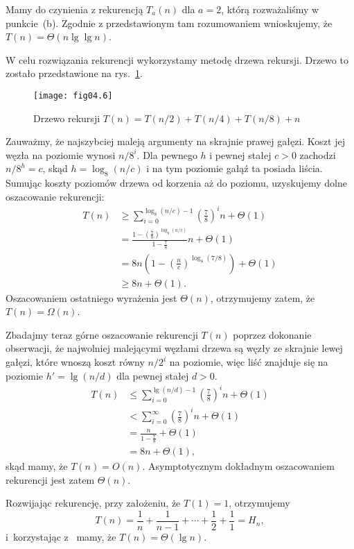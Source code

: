 \subproblem %
Mamy do czynienia z rekurencją $T_a(n)$ dla $a=2$, którą rozważaliśmy w punkcie~(b). Zgodnie z przedstawionym tam rozumowaniem wnioskujemy, że $T(n)=\Theta(n\lg\lg n)$.

\subproblem %
W celu rozwiązania rekurencji wykorzystamy metodę drzewa rekursji. Drzewo to zostało przedstawione na rys.~\ref{fig:4-4f}.
\begin{figure}[ht]
	\begin{center}
		\texttt{[image: fig04.6]}
	\end{center}
	\caption{Drzewo rekursji $T(n)=T(n/2)+T(n/4)+T(n/8)+n$} \label{fig:4-4f}
\end{figure}

Zauważmy, że najszybciej maleją argumenty na skrajnie prawej gałęzi. Koszt jej węzła na  poziomie wynosi $n/8^i$. Dla pewnego $h$ i pewnej stałej $c>0$ zachodzi $n/8^h=c$, skąd $h=\log_8(n/c)$ i na tym poziomie gałąź ta posiada liścia. Sumując koszty poziomów drzewa od korzenia aż do  poziomu, uzyskujemy dolne oszacowanie rekurencji:
\begin{align*}
	T(n) &\ge \sum_{i=0}^{\log_8(n/c)-1}\left(\frac{7}{8}\right)^in+\Theta(1) \\
	&= \frac{1-\left(\frac{7}{8}\right)^{\log_8(n/c)}}{1-\frac{7}{8}}n+\Theta(1) \\
	&= 8n\left(1-\left(\frac{n}{c}\right)^{\log_8(7/8)}\right)+\Theta(1) \\
	&\ge 8n+\Theta(1).
\end{align*}
Oszacowaniem ostatniego wyrażenia jest $\Theta(n)$, otrzymujemy zatem, że $T(n)=\Omega(n)$.

Zbadajmy teraz górne oszacowanie rekurencji $T(n)$ poprzez dokonanie obserwacji, że najwolniej malejącymi węzłami drzewa są węzły ze skrajnie lewej gałęzi, które wnoszą koszt równy $n/2^i$ na  poziomie, więc liść znajduje się na poziomie $h'=\lg(n/d)$ dla pewnej stałej $d>0$.
\begin{align*}
	T(n) &\le \sum_{i=0}^{\lg(n/d)-1}\left(\frac{7}{8}\right)^in+\Theta(1) \\
	&< \sum_{i=0}^\infty\left(\frac{7}{8}\right)^in+\Theta(1) \\
	&= \frac{n}{1-\frac{7}{8}}+\Theta(1) \\
	&= 8n+\Theta(1),
\end{align*}
skąd mamy, że $T(n)=O(n)$. Asymptotycznym dokładnym oszacowaniem rekurencji jest zatem $\Theta(n)$.

\subproblem %
Rozwijając rekurencję, przy założeniu, że $T(1)=1$, otrzymujemy
\[
	T(n) = \frac{1}{n}+\frac{1}{n-1}+\cdots+\frac{1}{2}+\frac{1}{1} = H_n,
\]
i~korzystając z~ mamy, że $T(n)=\Theta(\lg n)$.

